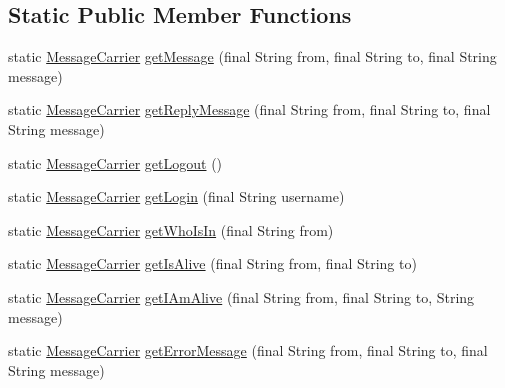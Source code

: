 \subsection*{Static Public Member Functions}
\begin{DoxyCompactItemize}
\item 
static \hyperlink{classgov_1_1fnal_1_1ppd_1_1dd_1_1chat_1_1xml_1_1MessageCarrier}{Message\-Carrier} \hyperlink{classgov_1_1fnal_1_1ppd_1_1dd_1_1chat_1_1xml_1_1MessageCarrier_a9500b286ef092fdee795f07609fe89f9}{get\-Message} (final String from, final String to, final String message)
\item 
static \hyperlink{classgov_1_1fnal_1_1ppd_1_1dd_1_1chat_1_1xml_1_1MessageCarrier}{Message\-Carrier} \hyperlink{classgov_1_1fnal_1_1ppd_1_1dd_1_1chat_1_1xml_1_1MessageCarrier_ac18b94ec8f86e35a94694f524ec6a06f}{get\-Reply\-Message} (final String from, final String to, final String message)
\item 
static \hyperlink{classgov_1_1fnal_1_1ppd_1_1dd_1_1chat_1_1xml_1_1MessageCarrier}{Message\-Carrier} \hyperlink{classgov_1_1fnal_1_1ppd_1_1dd_1_1chat_1_1xml_1_1MessageCarrier_a70c57ddb59d306f5e93c3d412bfce264}{get\-Logout} ()
\item 
static \hyperlink{classgov_1_1fnal_1_1ppd_1_1dd_1_1chat_1_1xml_1_1MessageCarrier}{Message\-Carrier} \hyperlink{classgov_1_1fnal_1_1ppd_1_1dd_1_1chat_1_1xml_1_1MessageCarrier_aea501df68f007586a06ae69ae47864d7}{get\-Login} (final String username)
\item 
static \hyperlink{classgov_1_1fnal_1_1ppd_1_1dd_1_1chat_1_1xml_1_1MessageCarrier}{Message\-Carrier} \hyperlink{classgov_1_1fnal_1_1ppd_1_1dd_1_1chat_1_1xml_1_1MessageCarrier_aa4afdb8b652424158fa71f9393c68dd0}{get\-Who\-Is\-In} (final String from)
\item 
static \hyperlink{classgov_1_1fnal_1_1ppd_1_1dd_1_1chat_1_1xml_1_1MessageCarrier}{Message\-Carrier} \hyperlink{classgov_1_1fnal_1_1ppd_1_1dd_1_1chat_1_1xml_1_1MessageCarrier_a695cf63f8504525519419397c042668d}{get\-Is\-Alive} (final String from, final String to)
\item 
static \hyperlink{classgov_1_1fnal_1_1ppd_1_1dd_1_1chat_1_1xml_1_1MessageCarrier}{Message\-Carrier} \hyperlink{classgov_1_1fnal_1_1ppd_1_1dd_1_1chat_1_1xml_1_1MessageCarrier_a71ad3383e87a0deb0f04cb95dfebcb29}{get\-I\-Am\-Alive} (final String from, final String to, String message)
\item 
static \hyperlink{classgov_1_1fnal_1_1ppd_1_1dd_1_1chat_1_1xml_1_1MessageCarrier}{Message\-Carrier} \hyperlink{classgov_1_1fnal_1_1ppd_1_1dd_1_1chat_1_1xml_1_1MessageCarrier_a88e429a9d5e778ec043f149e0ca1b3ac}{get\-Error\-Message} (final String from, final String to, final String message)

\end{DoxyCompactItemize}
